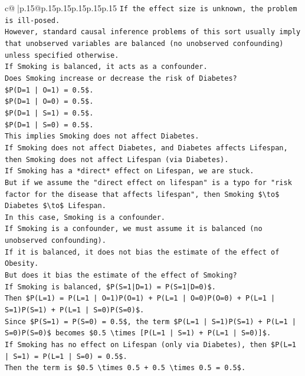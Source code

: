 \documentclass{article}
\begin{document}
{\begin{supertabular}{c@{$\;$}|p{.15\linewidth}@{}p{.15\linewidth}p{.15\linewidth}p{.15\linewidth}p{.15\linewidth}p{.15\linewidth}}
{{{\texttt{If the effect size is unknown, the problem is ill{-}posed.} \\
\texttt{However, standard causal inference problems of this sort usually imply that unobserved variables are balanced (no unobserved confounding) unless specified otherwise.} \\
\texttt{If Smoking is balanced, it acts as a confounder.} \\
\texttt{Does Smoking increase or decrease the risk of Diabetes?} \\
\texttt{\$P(D=1 | O=1) = 0.5\$.} \\
\texttt{\$P(D=1 | O=0) = 0.5\$.} \\
\texttt{\$P(D=1 | S=1) = 0.5\$.} \\
\texttt{\$P(D=1 | S=0) = 0.5\$.} \\
\texttt{This implies Smoking does not affect Diabetes.} \\
\texttt{If Smoking does not affect Diabetes, and Diabetes affects Lifespan, then Smoking does not affect Lifespan (via Diabetes).} \\
\texttt{If Smoking has a *direct* effect on Lifespan, we are stuck.} \\
\texttt{But if we assume the "direct effect on lifespan" is a typo for "risk factor for the disease that affects lifespan", then Smoking \$\textbackslash{}to\$ Diabetes \$\textbackslash{}to\$ Lifespan.} \\
\texttt{In this case, Smoking is a confounder.} \\
\texttt{If Smoking is a confounder, we must assume it is balanced (no unobserved confounding).} \\
\texttt{If it is balanced, it does not bias the estimate of the effect of Obesity.} \\
\texttt{But does it bias the estimate of the effect of Smoking?} \\
\texttt{If Smoking is balanced, \$P(S=1|D=1) = P(S=1|D=0)\$.} \\
\texttt{Then \$P(L=1) = P(L=1 | O=1)P(O=1) + P(L=1 | O=0)P(O=0) + P(L=1 | S=1)P(S=1) + P(L=1 | S=0)P(S=0)\$.} \\
\texttt{Since \$P(S=1) = P(S=0) = 0.5\$, the term \$P(L=1 | S=1)P(S=1) + P(L=1 | S=0)P(S=0)\$ becomes \$0.5 \textbackslash{}times {[}P(L=1 | S=1) + P(L=1 | S=0){]}\$.} \\
\texttt{If Smoking has no effect on Lifespan (only via Diabetes), then \$P(L=1 | S=1) = P(L=1 | S=0) = 0.5\$.} \\
\texttt{Then the term is \$0.5 \textbackslash{}times 0.5 + 0.5 \textbackslash{}times 0.5 = 0.5\$.} \\
}}}
\end{supertabular}}
\end{document}
